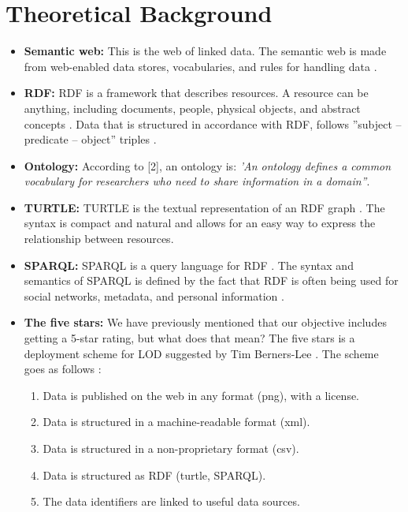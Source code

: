 \chapter{Theoretical Background}

\begin{itemize}
\item \textbf{Semantic web:} This is the web of linked data. The semantic web is made from web-enabled data stores, vocabularies, and rules for handling data \cite{semantic}. 

\item \textbf{RDF:} RDF is a framework that describes resources. A resource can be anything, including documents, people, physical objects, and abstract concepts \cite{rdf}. Data that is structured in accordance with RDF, follows ''subject – predicate – object'' triples \cite{rdf}.

\item \textbf{Ontology:} According to [2], an ontology is: \textit{'An ontology defines a common vocabulary for researchers who need to share information in a domain''}. 

\item \textbf{TURTLE:} TURTLE is the textual representation of an RDF graph \cite{turtle}. The syntax is compact and natural and allows for an easy way to express the relationship between resources.

\item \textbf{SPARQL:} SPARQL is a query language for RDF \cite{sparql}. The syntax and semantics of SPARQL is defined by the fact that RDF is often being used for social networks, metadata, and personal information \cite{sparql}.

\item \textbf{The five stars:} We have previously mentioned that our objective includes getting a 5-star rating, but what does that mean? The five stars is a deployment scheme for LOD suggested by Tim Berners-Lee \cite{lod}. The scheme goes as follows \cite{lod}:
	
	\begin{enumerate}
	\item Data is published on the web in any format (png), with a license.
	\item Data is structured in a machine-readable format (xml).
	\item Data is structured in a non-proprietary format (csv).
	\item Data is structured as RDF (turtle, SPARQL).
	\item The data identifiers are linked to useful data sources.
	\end{enumerate}

\end{itemize}

